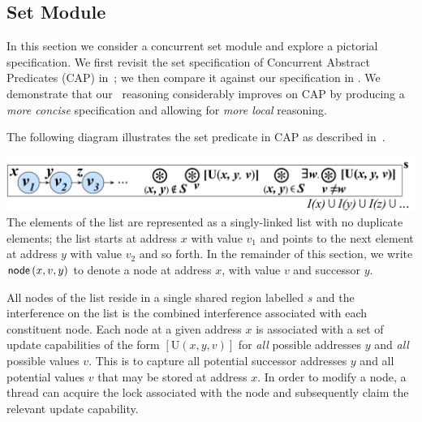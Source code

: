 \subsection{Set Module}\label{subsec:set}
In this section we consider a concurrent set module and explore a pictorial specification. We first revisit the set specification of Concurrent Abstract Predicates (CAP) in~\cite{cap-ecoop10}; we then compare it against our specification in \colosl. We demonstrate that our \colosl\ reasoning considerably improves on CAP by producing a \emph{more concise} specification and allowing for \emph{more local} reasoning. 

The following diagram illustrates the set predicate in CAP as described in~\cite{cap-ecoop10}.

%
{\centering \includegraphics[scale=0.232]{Sections/Examples/Images/capSet.pdf}\\}
%
%
The elements of the list are represented as a singly-linked list with no duplicate elements; the list starts at address $x$ with value $v_1$ and points to the next element at address $y$ with value $v_2$ and so forth. In the remainder of this section, we write $\textsf{node}\left(x, v, y\right)$ to denote a node at address $x$, with value $v$ and successor $y$. 

All nodes of the list reside in a single shared region labelled $s$ and the interference on the list is the combined interference associated with each constituent node. 
Each node at a given address $x$ is associated with a set of update capabilities of the form $[\text{U}(x, y, v)]$ for \emph{all} possible addresses $y$ and \emph{all} possible values $v$. This is to capture all potential successor addresses $y$ and all potential values $v$ that may be stored at address $x$. 
In order to modify a node, a thread can acquire the lock associated with the node and subsequently claim the relevant update capability.
% 

